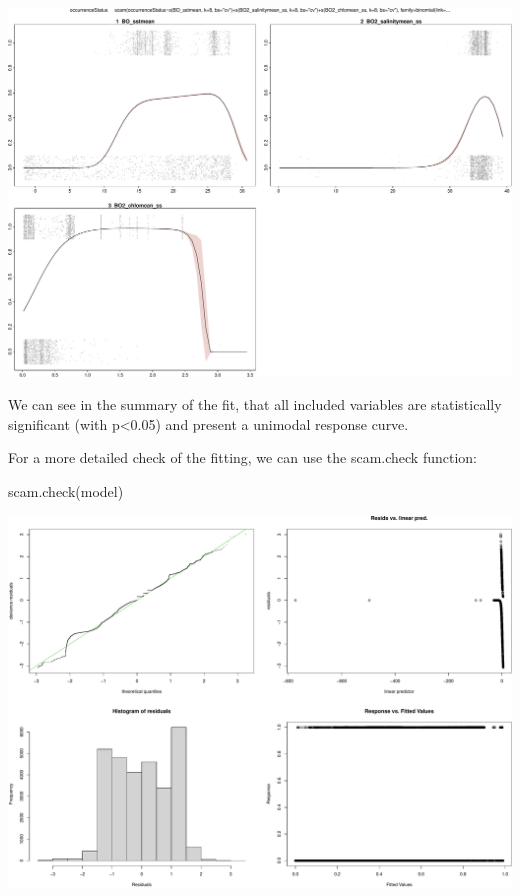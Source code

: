 \documentclass[
]{book}
\newenvironment{Shaded}{\begin{snugshade}}{\end{snugshade}}
\newcommand{\FunctionTok}[1]{\textcolor[rgb]{0.00,0.00,0.00}{#1}}
\newcommand{\NormalTok}[1]{#1}
\begin{document}
\includegraphics{_main_files/figure-latex/unnamed-chunk-64-1.pdf}

We can see in the summary of the fit, that all included variables are statistically significant (with p\textless0.05) and present a unimodal response curve.

For a more detailed check of the fitting, we can use the scam.check function:

\begin{Shaded}
\begin{Highlighting}[]
\FunctionTok{scam.check}\NormalTok{(model)}
\end{Highlighting}
\end{Shaded}

\includegraphics{_main_files/figure-latex/unnamed-chunk-65-1.pdf}
\end{document}
